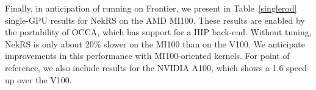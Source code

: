 Finally, in anticipation of running on Frontier, we present in
Table~\ref{singlerod} single-GPU results for NekRS on the AMD MI100.  These
results are enabled by the portability of OCCA, which has support for a HIP
back-end.  Without tuning, NekRS is only about 20\% slower on the MI100 than on
the V100.   We anticipate improvements in this performance with MI100-oriented
kernels.
For point of reference, we also include results for the NVIDIA
A100, which shows a 1.6 speed-up over the V100.



%





